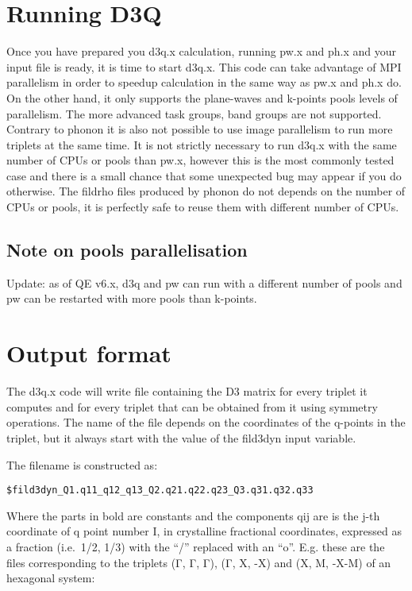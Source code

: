 \documentclass[
]{article}
\begin{document}
\hypertarget{running-d3q}{%
\section{Running D3Q}\label{running-d3q}}

Once you have prepared you d3q.x calculation, running pw.x and ph.x and
your input file is ready, it is time to start d3q.x. This code can take
advantage of MPI parallelism in order to speedup calculation in the same
way as pw.x and ph.x do. On the other hand, it only supports the
plane-waves and k-points pools levels of parallelism. The more advanced
task groups, band groups are not supported. Contrary to phonon it is
also not possible to use image parallelism to run more triplets at the
same time. It is not strictly necessary to run d3q.x with the same
number of CPUs or pools than pw.x, however this is the most commonly
tested case and there is a small chance that some unexpected bug may
appear if you do otherwise. The fildrho files produced by phonon do not
depends on the number of CPUs or pools, it is perfectly safe to reuse
them with different number of CPUs.

\hypertarget{note-on-pools-parallelisation}{%
\subsection{Note on pools
parallelisation}\label{note-on-pools-parallelisation}}

Update: as of QE v6.x, d3q and pw can run with a different number of
pools and pw can be restarted with more pools than k-points.

\hypertarget{output-format}{%
\section{Output format}\label{output-format}}

The d3q.x code will write file containing the D3 matrix for every
triplet it computes and for every triplet that can be obtained from it
using symmetry operations. The name of the file depends on the
coordinates of the q-points in the triplet, but it always start with the
value of the fild3dyn input variable.

The filename is constructed as:

\begin{verbatim}
$fild3dyn_Q1.q11_q12_q13_Q2.q21.q22.q23_Q3.q31.q32.q33
\end{verbatim}

Where the parts in bold are constants and the components qij are is the
j-th coordinate of q point number I, in crystalline fractional
coordinates, expressed as a fraction (i.e.~1/2, 1/3) with the
\enquote{/} replaced with an \enquote{o}. E.g. these are the files
corresponding to the triplets (Γ, Γ, Γ), (Γ, X, -X) and (X, M, -X-M) of
an hexagonal system:
\end{document}
